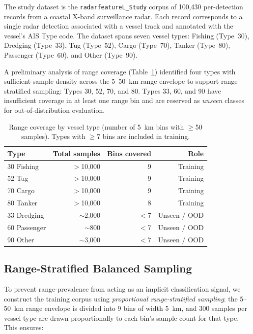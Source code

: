 \documentclass[journal]{IEEEtran}
\begin{document}
The study dataset is the \texttt{radarfeatureL\_Study} corpus of
100,430 per-detection records from a coastal X-band surveillance radar.
Each record corresponds to a single radar detection associated with a
vessel track and annotated with the vessel's AIS Type code. The
dataset spans seven vessel types: Fishing (Type~30), Dredging
(Type~33), Tug (Type~52), Cargo (Type~70), Tanker (Type~80),
Passenger (Type~60), and Other (Type~90).

A preliminary analysis of range coverage (Table~\ref{tab:range_coverage})
identified four types with sufficient sample density across the
5--50~km range envelope to support range-stratified sampling: Types
30, 52, 70, and 80. Types 33, 60, and 90 have insufficient coverage
in at least one range bin and are reserved as \emph{unseen} classes
for out-of-distribution evaluation.

\begin{table}[H]
\centering
\caption{Range coverage by vessel type (number of 5~km bins with $\geq$50
         samples). Types with $\geq$7 bins are included in training.}
\label{tab:range_coverage}
\begin{tabular}{lrrr}
\toprule
\textbf{Type} & \textbf{Total samples} & \textbf{Bins covered} & \textbf{Role} \\
\midrule
30 Fishing  & $>$10,000 & 9  & Training \\
52 Tug      & $>$10,000 & 9  & Training \\
70 Cargo    & $>$10,000 & 9  & Training \\
80 Tanker   & $>$10,000 & 8  & Training \\
33 Dredging & $\sim$2,000 & $<$7 & Unseen / OOD \\
60 Passenger& $\sim$800   & $<$7 & Unseen / OOD \\
90 Other    & $\sim$3,000 & $<$7 & Unseen / OOD \\
\bottomrule
\end{tabular}
\end{table}

\subsection{Range-Stratified Balanced Sampling}
\label{sec:stratified}

To prevent range-prevalence from acting as an implicit classification
signal, we construct the training corpus using \emph{proportional
range-stratified sampling}: the 5--50~km range envelope is divided into
9 bins of width 5~km, and 300 samples per vessel type are drawn
proportionally to each bin's sample count for that type. This ensures:
\end{document}
